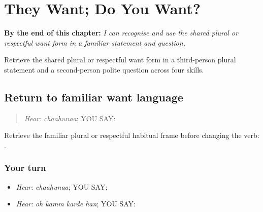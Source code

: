 
\chapter{They Want; Do You Want?}
\label{ch:pa-a2-want-plural}

\begin{chapteropening}
\textbf{By the end of this chapter:} \emph{I can recognise and use the shared plural or respectful want form in a familiar statement and question.}

Retrieve the shared plural or respectful want form in a third-person plural statement and a second-person polite question across four skills.
\end{chapteropening}

\section[\texorpdfstring{\pa{ਚਾਹੁਣਾ} · \pa{ਉਹ} \pa{ਕੰਮ} … (chaahunaa; oh …)}{ਚਾਹੁਣਾ · ਉਹ ਕੰਮ … (chaahunaa; oh …)}]{Return to familiar want language}

\label{lesson:PA-C189-want-return}



\begin{quote}
\emph{Hear:} \emph{chaahunaa}; YOU SAY: \textbf{}
\end{quote}

\begin{grammarlens}[title={Grammar Lens}]
Retrieve the familiar plural or respectful habitual frame before changing the verb: \textbf{   }.
\end{grammarlens}

\subsection*{Your turn}
\begin{itemize}
\raggedright
  \item \emph{Hear:} \emph{chaahunaa}; YOU SAY: \textbf{}
  \item \emph{Hear:} \emph{oh kamm karde han}; YOU SAY: \textbf{   }
\end{itemize}


